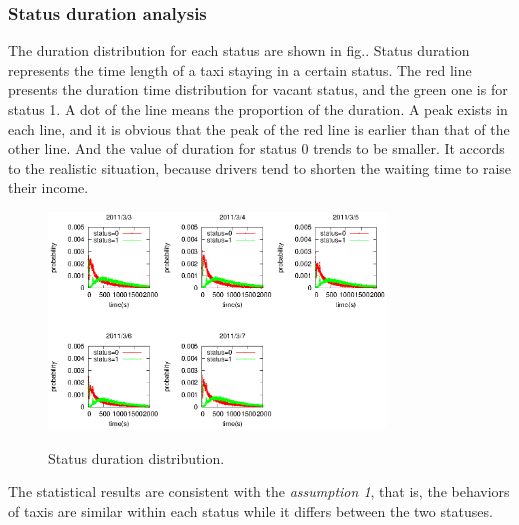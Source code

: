 \subsubsection{Status duration analysis}
  The duration distribution for each status are shown in fig.\label{figure_duration_for_each_status}. Status duration represents the time length of a taxi staying in a certain status. The red line presents the duration time distribution for vacant status, and the green one is for status 1. A dot of the line means the proportion of the duration. A peak exists in each line, and it is obvious that the peak of the red line is earlier than that of the other line. And the value of duration for status 0 trends to be smaller. It accords to the realistic situation, because drivers tend to shorten the waiting time to raise their income.
\begin{figure}[htbp]
\centering
\includegraphics[width=0.8\textwidth]{figures_201103/LastingTime_event.eps}\\
\caption{Status duration distribution.}\label{figure_duration_for_each_status}
\end{figure}

The statistical results are consistent with the \emph{assumption 1}, that is, the behaviors of taxis are similar within each status while it differs between the two statuses. 